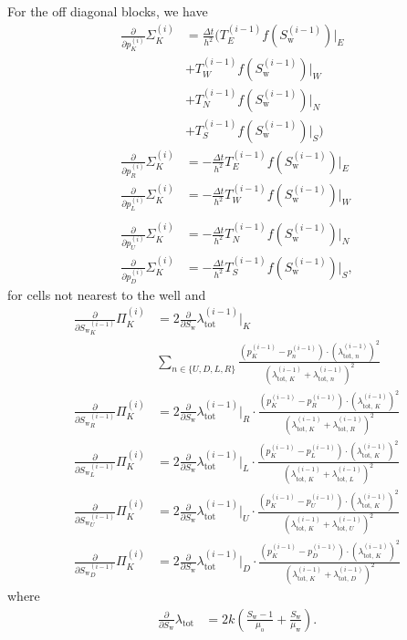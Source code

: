 \documentclass[conference]{IEEEtran}
\newcommand*{\pdiff}[2]{\ensuremath{\frac{\partial}{\partial{#2}}{#1}}}
\begin{document}
For the off diagonal blocks, we have
\begin{align}
\pdiff{\Sigma_K^{(i)}}{p_K^{(i)}} &= \frac{\Delta t}{h^2} \biggr(T_E^{(i-1)} f(S_\text{w}^{(i-1)})\lvert_E \\&+ T_W^{(i-1)} f(S_\text{w}^{(i-1)})\lvert_W \nonumber\\&+ T_N^{(i-1)} f(S_\text{w}^{(i-1)})\lvert_N \nonumber\\&+T_S^{(i-1)}  f(S_\text{w}^{(i-1)})\lvert_S\biggr) \nonumber\\
\pdiff{\Sigma_K^{(i)}}{p_R^{(i)}} &= -\frac{\Delta t}{h^2}T_E^{(i-1)} f(S_\text{w}^{(i-1)})\lvert_E \\
\pdiff{\Sigma_K^{(i)}}{p_L^{(i)}} &= -\frac{\Delta t}{h^2}T_W^{(i-1)} f(S_\text{w}^{(i-1)})\lvert_W \\\\
\pdiff{\Sigma_K^{(i)}}{p_U^{(i)}} &= -\frac{\Delta t}{h^2}T_N^{(i-1)} f(S_\text{w}^{(i-1)})\lvert_N \\
\pdiff{\Sigma_K^{(i)}}{p_D^{(i)}} &= -\frac{\Delta t}{h^2}T_S^{(i-1)} f(S_\text{w}^{(i-1)})\lvert_S,
\end{align}
for cells not nearest to the well and
\begin{align}
\pdiff{\Pi_K^{(i)}}{{S_\text{w}}_K^{(i-1)}} &= 2 \pdiff{\lambda_\text{tot}^{(i-1)}}{S_\text{w}}\lvert_K\\&\sum_{n\in\{U, D, L, R\}} \frac{(p_K^{(i-1)} - p_n^{(i-1)}) \cdot (\lambda_{\text{tot, }n}^{(i-1)})^2}{(\lambda_{\text{tot, }K}^{(i-1)} + \lambda_{\text{tot, }n}^{(i-1)})^2} \nonumber\\
\pdiff{\Pi_K^{(i)}}{{S_\text{w}}_R^{(i-1)}} &= 2 \pdiff{\lambda_\text{tot}^{(i-1)}}{S_\text{w}}\lvert_R \cdot
\frac{(p_K^{(i-1)} - p_R^{(i-1)}) \cdot (\lambda_{\text{tot, }K}^{(i-1)})^2}{(\lambda_{\text{tot, }K}^{(i-1)} + \lambda_{\text{tot, }R}^{(i-1)})^2} \\
\pdiff{\Pi_K^{(i)}}{{S_\text{w}}_L^{(i-1)}} &= 2 \pdiff{\lambda_\text{tot}^{(i-1)}}{S_\text{w}}\lvert_L \cdot
\frac{(p_K^{(i-1)} - p_L^{(i-1)}) \cdot (\lambda_{\text{tot, }K}^{(i-1)})^2}{(\lambda_{\text{tot, }K}^{(i-1)} + \lambda_{\text{tot, }L}^{(i-1)})^2} \\
\pdiff{\Pi_K^{(i)}}{{S_\text{w}}_U^{(i-1)}} &= 2 \pdiff{\lambda_\text{tot}^{(i-1)}}{S_\text{w}}\lvert_U \cdot
\frac{(p_K^{(i-1)} - p_U^{(i-1)}) \cdot (\lambda_{\text{tot, }K}^{(i-1)})^2}{(\lambda_{\text{tot, }K}^{(i-1)} + \lambda_{\text{tot, }U}^{(i-1)})^2} \\
\pdiff{\Pi_K^{(i)}}{{S_\text{w}}_D^{(i-1)}} &= 2 \pdiff{\lambda_\text{tot}^{(i-1)}}{S_\text{w}}\lvert_D \cdot
\frac{(p_K^{(i-1)} - p_D^{(i-1)}) \cdot (\lambda_{\text{tot, }K}^{(i-1)})^2}{(\lambda_{\text{tot, }K}^{(i-1)} + \lambda_{\text{tot, }D}^{(i-1)})^2}
\end{align}
where
\begin{align}
\pdiff{\lambda_\text{tot}}{S_\text{w}} &= 2k\left(\frac{S_\text{w} - 1}{\mu_\text{o}} + \frac{S_\text{w}}{\mu_\text{w}}\right).
\end{align}
\end{document}
